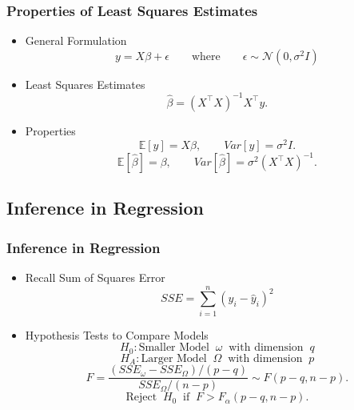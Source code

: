 \documentclass[serif,mathserif,professionalfont]{beamer}
\begin{document}
\begin{frame}
	
	\frametitle{Properties of Least Squares Estimates}
	
	\begin{itemize}
		\item General Formulation
		$$ y = X \beta + \epsilon \qquad \text{where} \qquad \epsilon \sim  \mathcal{N}(0, \sigma^2 I) $$
		\item Least Squares Estimates
		$$ \widehat{\beta} = \left(X^\top X \right)^{-1} X^\top y. $$
		\item Properties 
		$$ \mathbb{E}\left[y\right] = X \beta, \qquad Var\left[y\right] = \sigma^2 I. $$
		$$ \mathbb{E}\left[\widehat{\beta} \right] = \beta, \qquad Var\left[\widehat{\beta} \right] = \sigma^2 \left(X^\top X \right)^{-1}. $$
	\end{itemize}

	
	
\end{frame}









\subsection{Inference in Regression}


%	
%	
%	

\begin{frame}
	
	\frametitle{Inference in Regression}
	
	\begin{itemize}
		\item Recall Sum of Squares Error
		$$ SSE = \sum_{i=1}^{n} \left(y_i - \widehat{y}_i \right)^2 $$
		\item Hypothesis Tests to Compare Models
		$$ H_0: \text{Smaller Model} \;\; \omega \;\; \text{with dimension} \;\; q  $$
		$$ H_A: \text{Larger Model} \;\; \Omega \;\; \text{with dimension} \;\; p $$
		$$ F = \frac{\left(SSE_{\omega} - SSE_{\Omega} \right) / \left(p-q \right)}{SSE_{\Omega}/(n-p)}  \sim F(p-q, n-p). $$
		$$ \text{Reject} \;\; H_0 \;\; \text{if} \;\; F > F_{\alpha}(p-q, n-p). $$
	\end{itemize}

	
\end{frame}
\end{document}
